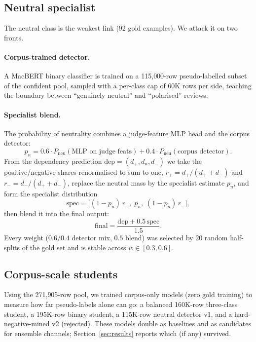 \documentclass[11pt,a4paper]{article}
\begin{document}
\subsection{Neutral specialist}
\label{sec:neu}

The neutral class is the weakest link (92 gold examples). We attack it
on two fronts.

\paragraph{Corpus-trained detector.} A MacBERT binary classifier is
trained on a 115{,}000-row pseudo-labelled subset of the confident
pool, sampled with a per-class cap of 60K rows per side, teaching the
boundary between ``genuinely neutral'' and ``polarised'' reviews.

\paragraph{Specialist blend.} The probability of neutrality combines a
judge-feature MLP head and the corpus detector:
\[
  p_n = 0.6 \cdot P_{\text{neu}}(\text{MLP on judge feats})
      + 0.4 \cdot P_{\text{neu}}(\text{corpus detector}).
\]
From the dependency prediction $\mathrm{dep}=(d_+,d_n,d_-)$ we take the
positive/negative shares renormalised to sum to one,
$r_+ = d_+/(d_+ + d_-)$ and $r_- = d_-/(d_+ + d_-)$, replace the
neutral mass by the specialist estimate $p_n$, and form the
specialist distribution
\[
  \mathrm{spec} = \bigl[(1-p_n)\,r_{+},\; p_n,\;
                    (1-p_n)\,r_{-}\bigr],
\]
then blend it into the final output:
\[
  \mathrm{final} = \frac{\mathrm{dep} + 0.5\,\mathrm{spec}}{1.5}.
\]
Every weight ($0.6/0.4$ detector mix, $0.5$ blend) was selected by
20 random half-splits of the gold set and is stable across
$w \in [0.3, 0.6]$.

\subsection{Corpus-scale students}
\label{sec:corpus}

Using the 271{,}905-row pool, we trained corpus-only models (zero gold
training) to measure how far pseudo-labels alone can go: a balanced
160K-row three-class student, a 195K-row binary student, a 115K-row
neutral detector v1, and a hard-negative-mined v2 (rejected). These
models double as baselines and as candidates for ensemble channels;
Section~\ref{sec:results} reports which (if any) survived.
\end{document}
